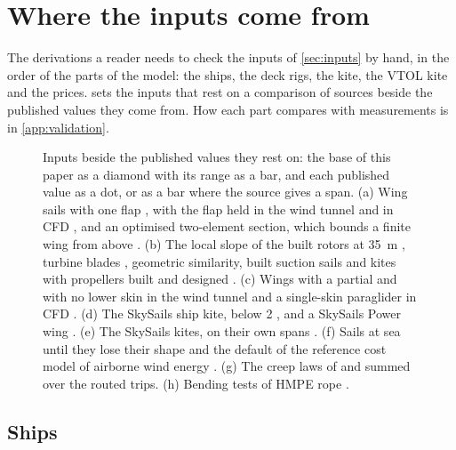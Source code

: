 \section{Where the inputs come from}
\label{app:derivations}

The derivations a reader needs to check the inputs of \cref{sec:inputs} by hand, in the order of the parts of the model: the ships, the deck rigs, the kite, the VTOL kite and the prices.  sets the inputs that rest on a comparison of sources beside the published values they come from. How each part compares with measurements is in \cref{app:validation}.

\begin{figure}[tbp]
\centering
{}
\caption{Inputs beside the published values they rest on: the base of this paper as a diamond with its range as a bar, and each published value as a dot, or as a bar where the source gives a span. (a) Wing sails with one flap \citep{rechevilanova2021}, with the flap held in the wind tunnel and in CFD \citep{wright2024wingsail}, and an optimised two-element section, which bounds a finite wing from above \citep{yao2026}. (b) The local slope of the built rotors at \SI{35}{m} \citep{norsepower2025}, turbine blades \citep{fingersh2006}, geometric similarity, built suction sails \citep{econowind2026vf3,econowind2026vf5} and kites with propellers built and designed \citep{sommerfeld2022scaling,vanhagen2023,noth2008}. (c) Wings with a partial and with no lower skin in the wind tunnel \citep{maughmer1979} and a single-skin paraglider in CFD \citep{maslanka2024}. (d) The SkySails ship kite, below 2 \citep{paulig2013}, and a SkySails Power wing \citep{folkersma2020}. (e) The SkySails kites, on their own spans \citep{paulig2013,erhard2013,folkersma2020}. (f) Sails at sea until they lose their shape \citep{flynn2015} and the default of the reference cost model of airborne wind energy \citep{joshi2024refeconomic}. (g) The creep laws of \citet{humeau2018} and \citet{bosman2013} summed over the routed trips. (h) Bending tests of HMPE rope \citep{bosman2013,davies2015}.}
\label{fig:input_sources}
\end{figure}

\subsection{Ships}
\label{sec:det_ships}

